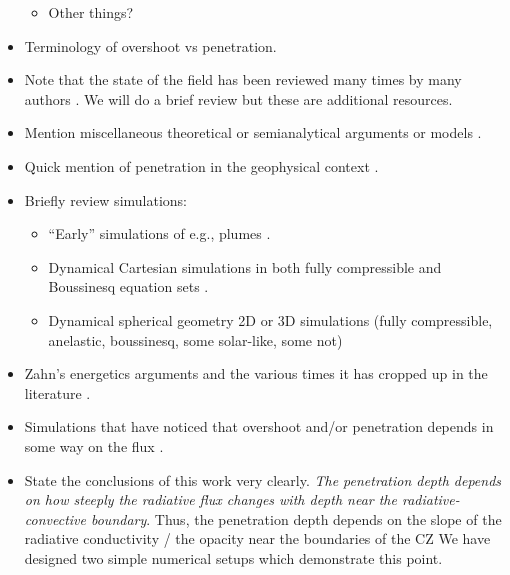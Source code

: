 \documentclass[12pt, fullpage]{article}
\begin{document}
\begin{itemize}
\begin{itemize}
\item Other things?
\end{itemize}
\item Terminology of overshoot vs penetration.
\item Note that the state of the field has been reviewed many times by many authors \citep{marcus_etal_1983, zahn1991, browning_etal_2004, rogers_etal_2006, viallet_etal_2015, korre_etal_2019}.
We will do a brief review but these are additional resources.
\item Mention miscellaneous theoretical or semianalytical arguments or models \citep{roxburgh1965, roxburgh1978, roxburgh1989, roxburgh1992, roxburgh1998, marcus_etal_1983, zahn1991, hurlburt_etal_1994, rempel2004, canuto2011, viallet_etal_2015, rieutord2019, korre_etal_2019}.
\item Quick mention of penetration in the geophysical context \citep[including neat lab experiments like][]{deardorff_etal_1969}.
\item Briefly review simulations:
\begin{itemize}
\item ``Early'' simulations of e.g., plumes \citep{schmitt_etal_1984}.
\item Dynamical Cartesian simulations in both fully compressible and Boussinesq equation sets \citep{musman1968, moore_weiss_1973, hurlburt_etal_1986, hurlburt_etal_1994, singh_etal_1995, saikia_etal_2000, brummell_etal_2002, rogers_glatzmaier_2005, kapyla_etal_2007, tian_etal_2009, kitiashvili_etal_2016, lecoanet_etal_2016, kapyla_etal_2017, couston_etal_2017, toppaladoddi_wettlaufer_2018, kapyla2019, cai2020}.
\item Dynamical spherical geometry 2D or 3D simulations (fully compressible, anelastic, boussinesq, some solar-like, some not) \citep{browning_etal_2004, rogers_etal_2006, brun_etal_2017, pratt_etal_2017, dietrich_wicht_2018, higl_etal_2021}
\end{itemize}
\item Zahn's energetics arguments and the various times it has cropped up in the literature \citep{zahn1991, hurlburt_etal_1994, rempel2004, rogers_etal_2006}.
\item Simulations that have noticed that overshoot and/or penetration depends in some way on the flux \citep{singh_etal_1998, hotta2017, kapyla2019}.
\item State the conclusions of this work very clearly. 
\emph{The penetration depth depends on how steeply the radiative flux changes with depth near the radiative-convective boundary}.
Thus, the penetration depth depends on the slope of the radiative conductivity / the opacity near the boundaries of the CZ
We have designed two simple numerical setups which demonstrate this point.
\end{itemize}
\end{document}
